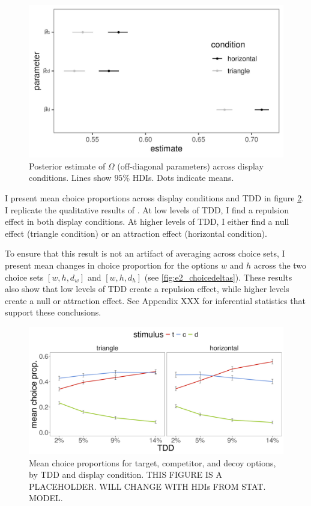 {{{{\begin{figure}
   \includegraphics[width=\textwidth]{figures/bayes_circle_area_sigma_constant_comp_effect_omega_plot.jpeg}
   \caption{Posterior estimate of $\Omega$ (off-diagonal parameters) across display conditions. Lines show $95\%$ HDIs.  Dots indicate means.}
   \label{fig:omega}
\end{figure}


I present mean choice proportions across display conditions and TDD in figure \ref{fig:e2_choiceprops}. I replicate the qualitative results of \textcite{spektorWhenGoodLooks2018b}. At low levels of TDD, I find a repulsion effect in both display conditions. At higher levels of TDD, I either find a null effect (triangle condition) or an attraction effect (horizontal condition). 

To ensure that this result is not an artifact of averaging across choice sets, I present mean changes in choice proportion for the options $w$ and $h$ across the two choice sets $[w,h,d_{w}]$ and $[w,h,d_{h}]$ (see \ref{fig:e2_choicedeltas}). These results also show that low levels of TDD create a repulsion effect, while higher levels create a null or attraction effect. See Appendix XXX for inferential statistics that support these conclusions.

\begin{figure}
   \includegraphics[width=\textwidth]{figures/choicePhase_att_trials_mean_choice_props_collapsed.jpg}
   \caption{Mean choice proportions for target, competitor, and decoy options, by TDD and display condition. THIS FIGURE IS A PLACEHOLDER. WILL CHANGE WITH HDIs FROM STAT. MODEL.}
   \label{fig:e2_choiceprops}
\end{figure}

}}}}

